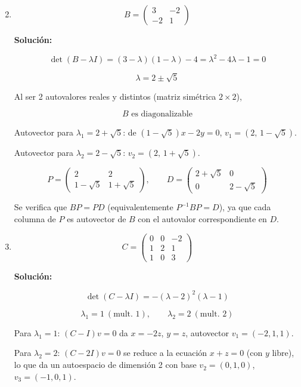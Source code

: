 \documentclass[12pt]{article}
\newcommand{\solucion}{%
    \vspace{0.8em}%
    \textbf{Solución:}%
    \vspace{0.8em}%
}
\begin{document}
\begin{enumerate}[label=\alph*.-]

    \setcounter{enumi}{1}

    \item
    \[
    B=\begin{pmatrix}3&-2\\-2&1\end{pmatrix}
    \]

    \solucion

    \[
    \det(B-\lambda I)=(3-\lambda)(1-\lambda)-4=\lambda^2-4\lambda-1=0
    \]

    \[
    \boxed{\lambda=2\pm\sqrt5}
    \]

    Al ser 2 autovalores reales y distintos (matriz simétrica $2\times2$),

    \[
    \boxed{B \text{ es diagonalizable}}
    \]

    Autovector para $\lambda_1=2+\sqrt5$: de $(1-\sqrt5)x-2y=0$,
    $v_1=(2,\,1-\sqrt5)$.

    Autovector para $\lambda_2=2-\sqrt5$: $v_2=(2,\,1+\sqrt5)$.

    \[
    P=\begin{pmatrix}2&2\\1-\sqrt5&1+\sqrt5\end{pmatrix},\qquad
    D=\begin{pmatrix}2+\sqrt5&0\\0&2-\sqrt5\end{pmatrix}
    \]

    Se verifica que $BP=PD$ (equivalentemente $P^{-1}BP=D$), ya que
    cada columna de $P$ es autovector de $B$ con el autovalor
    correspondiente en $D$.


    \item
    \[
    C=\begin{pmatrix}0&0&-2\\1&2&1\\1&0&3\end{pmatrix}
    \]

    \solucion

    \[
    \det(C-\lambda I)=-(\lambda-2)^2(\lambda-1)
    \]

    \[
    \boxed{\lambda_1=1\ (\text{mult. } 1), \qquad \lambda_2=2\ (\text{mult. } 2)}
    \]

    Para $\lambda_1=1$: $(C-I)v=0$ da $x=-2z$, $y=z$, autovector
    $v_1=(-2,1,1)$.

    Para $\lambda_2=2$: $(C-2I)v=0$ se reduce a la ecuación
    $x+z=0$ (con $y$ libre), lo que da un autoespacio de dimensión 2
    con base $v_2=(0,1,0)$, $v_3=(-1,0,1)$.


\end{enumerate}
\end{document}
